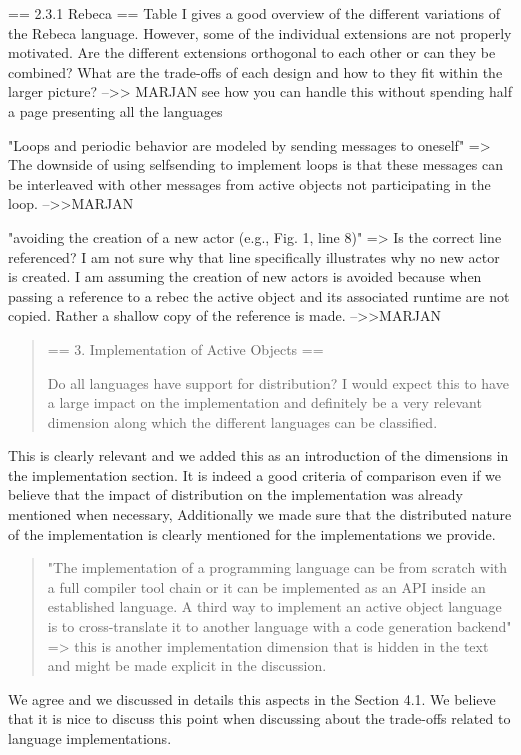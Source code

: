\documentclass{article}
\begin{document}
== 2.3.1 Rebeca ==
Table I gives a good overview of the different variations of the Rebeca language. 
However, some of the individual extensions are not properly motivated. Are the different 
extensions orthogonal to each other or can they be combined? What are the trade-offs of 
each design and how to they fit within the larger picture?
-->> MARJAN see how you can handle this without spending half a page presenting all the 
languages


"Loops and periodic behavior are modeled by sending messages to oneself" => The downside 
of using selfsending to implement loops is that these messages can be interleaved with 
other messages from active objects not participating in the loop.
-->>MARJAN

"avoiding the creation of a new actor (e.g., Fig. 1, line 8)" => Is the correct line 
referenced? I am not sure why that line specifically illustrates why no new actor is 
created. I am assuming the creation of new actors is avoided because when passing a 
reference to a rebec the active object and its associated runtime are not copied. Rather 
a shallow copy of the reference is made.
-->>MARJAN


\begin{quote}
	== 3. Implementation of Active Objects ==

Do all languages have support for distribution? I would expect this to have a large 
impact on the implementation and definitely be a very relevant dimension along which the 
different languages can be classified.
\end{quote}
This is clearly relevant and  we added this as an introduction of the dimensions in the 
implementation section. It 
is indeed a good criteria of comparison even if we believe that the impact of 
distribution on the implementation was already 
mentioned when necessary, Additionally we made sure that the distributed nature of the 
implementation is clearly mentioned for the implementations we provide.


\begin{quote}
 "The implementation of a programming language can be from scratch with a full compiler 
tool chain or it can be implemented as an API inside an established language. A third way 
to implement an active object language is to cross-translate it to another language with 
a code generation backend" => this is another implementation dimension that is hidden in 
the text and might be made explicit in the discussion.
\end{quote}
We agree and we discussed in details this aspects in the Section 4.1. We believe that it 
is nice to discuss this point when discussing about the trade-offs related to language 
implementations.
\end{document}
